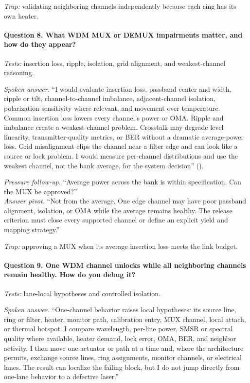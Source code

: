 \textit{Trap:} validating neighboring channels independently because each ring
has its own heater.

\paragraph{Question 8. What WDM MUX or DEMUX impairments matter, and how do they
appear?}
\textit{Tests:} insertion loss, ripple, isolation, grid alignment, and
weakest-channel reasoning.

\textit{Spoken answer.}
``I would evaluate insertion loss, passband center and width, ripple or tilt,
channel-to-channel imbalance, adjacent-channel isolation, polarization
sensitivity where relevant, and movement over temperature. Common insertion loss
lowers every channel's power or OMA. Ripple and imbalance create a
weakest-channel problem. Crosstalk may degrade level linearity,
transmitter-quality metrics, or BER without a dramatic average-power loss. Grid
misalignment clips the channel near a filter edge and can look like a source or
lock problem. I would measure per-channel distributions and use the weakest
channel, not the bank average, for the system decision''
().

\textit{Pressure follow-up.} ``Average power across the bank is within
specification. Can the MUX be approved?''\\
\textit{Answer pivot.} ``Not from the average. One edge channel may have poor
passband alignment, isolation, or OMA while the average remains healthy. The
release criterion must close every supported channel or define an explicit yield
and mapping strategy.''

\textit{Trap:} approving a MUX when its average insertion loss meets the link
budget.

\paragraph{Question 9. One WDM channel unlocks while all neighboring channels
remain healthy. How do you debug it?}
\textit{Tests:} lane-local hypotheses and controlled isolation.

\textit{Spoken answer.}
``One-channel behavior raises local hypotheses: its source line, ring or filter,
heater, monitor path, calibration entry, MUX channel, local attach, or thermal
hotspot. I compare wavelength, per-line power, SMSR or spectral quality where
available, heater demand, lock error, OMA, BER, and neighbor activity. I then
move one actuator or path at a time and, where the architecture permits,
exchange source lines, ring assignments, monitor channels, or electrical lanes.
The result can localize the failing block, but I do not jump directly from
one-lane behavior to a defective laser.''

